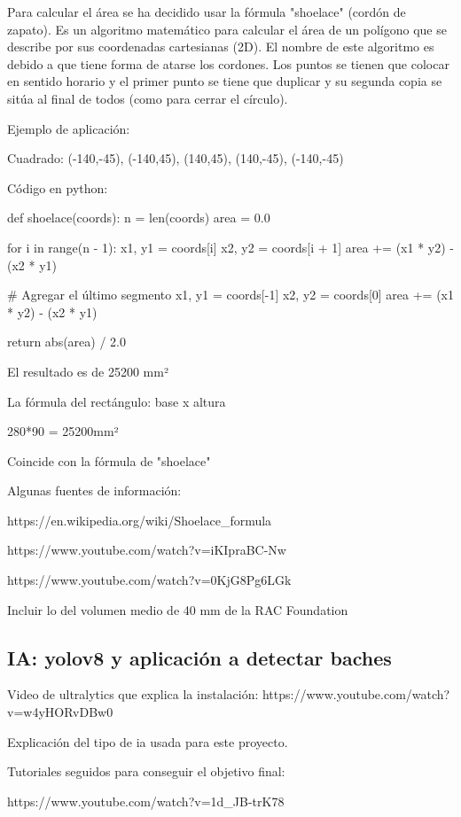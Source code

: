Para calcular el área se ha decidido usar la fórmula "shoelace" (cordón de zapato). Es un algoritmo matemático para calcular el área de un polígono que se describe por sus coordenadas cartesianas (2D). El nombre de este algoritmo es debido a que tiene forma de atarse los cordones. Los puntos se tienen que colocar en sentido horario y el primer punto se tiene que duplicar y su segunda copia se sitúa al final de todos (como para cerrar el círculo).

Ejemplo de aplicación:

Cuadrado: (-140,-45), (-140,45), (140,45), (140,-45), (-140,-45)

Código en python:

def shoelace(coords):
n = len(coords)
area = 0.0

for i in range(n - 1):
x1, y1 = coords[i]
x2, y2 = coords[i + 1]
area += (x1 * y2) - (x2 * y1)

\# Agregar el último segmento
x1, y1 = coords[-1]
x2, y2 = coords[0]
area += (x1 * y2) - (x2 * y1)

return abs(area) / 2.0

El resultado es de 25200 mm²

La fórmula del rectángulo: base x altura

280*90 = 25200mm²

Coincide con la fórmula de "shoelace"

Algunas fuentes de información:

https://en.wikipedia.org/wiki/Shoelace\_formula

https://www.youtube.com/watch?v=iKIpraBC-Nw

https://www.youtube.com/watch?v=0KjG8Pg6LGk


Incluir lo del volumen medio de 40 mm de la RAC Foundation

\subsection{IA: yolov8 y aplicación a detectar baches}

\label{subsec:softwareiayolo}


Video de ultralytics que explica la instalación: https://www.youtube.com/watch?v=w4yHORvDBw0

Explicación del tipo de ia usada para este proyecto.

Tutoriales seguidos para conseguir el objetivo final: 

https://www.youtube.com/watch?v=1d\_JB-trK78

